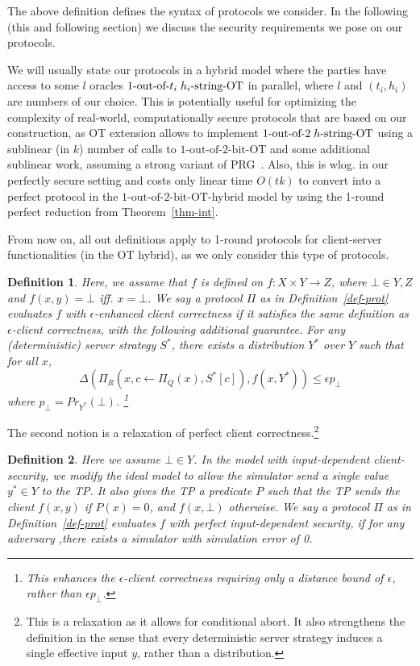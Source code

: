 \documentclass[a4paper]{article}
\newtheorem{definition}{Definition}[section]
\newcommand{\OT}[2]{#1\text{-out-of-}#2\text{-bit-OT}}
\newcommand{\sOT}[3]{#1\text{-out-of-}#2\text{\;$#3$-string-OT}}
\begin{document}
The above definition defines the syntax of protocols we consider. In the following (this and following section) we discuss the security requirements we pose on our protocols.

We will usually state our protocols in a hybrid model where the parties have access to some $l$ oracles $\sOT{1}{t_i}{h_i}$ in parallel, where $l$ and $(t_i,h_i)$ are numbers of our choice. 
This is potentially useful for optimizing the complexity of real-world, computationally secure protocols that are based on our construction, as OT extension allows to implement $\sOT{1}{2}{h}$ using a sublinear (in $k$) number of calls to $\OT{1}{2}$ and some additional sublinear work, assuming a strong variant of PRG~\cite{IKOS08}. 
Also, this is wlog. in our perfectly secure setting and costs only linear time $O(tk)$ to convert into a perfect protocol in the $\OT{1}{2}$-hybrid model by using the 1-round perfect reduction from Theorem~\ref{thm-int}.

From now on, all out definitions apply to 1-round protocols for client-server functionalities (in the OT hybrid), as we only consider this type of protocols. 

\begin{definition}\label{def-enh-cl}
Here, we assume that $f$ is defined on $f:X\times Y \rightarrow Z$,  where $\bot\in Y,Z$ and $f(x,y)=\bot$ iff. $x=\bot$.	
We say a protocol $\Pi$ as in Definition~\ref{def-prot} evaluates $f$ with  $\epsilon$-enhanced client correctness if it satisfies the same definition as $\epsilon$-client correctness, with the following additional guarantee.
For any (deterministic) server strategy $S^*$, there exists a distribution $Y^*$ over $Y$ such that for all $x$,
\[\Delta(\Pi_R(x,c\leftarrow \Pi_Q(x),S^*[c]), f(x,Y^*))\leq \epsilon p_{\bot}\] where $p_\bot=Pr_{Y^*}(\bot)$. \footnote{This enhances the $\epsilon$-client correctness requiring only a distance bound 
of $\epsilon$, rather than $\epsilon p_\bot$.} 
\end{definition}

The second notion is a relaxation of perfect client correctness.\footnote{This is a relaxation as it allows for conditional abort. It also strengthens the definition in the sense that every deterministic server strategy induces a single effective input $y$, rather than a distribution.}

\begin{definition}
Here we assume $\bot\in Y$.	
In the model with input-dependent client-security, we modify the ideal model to allow the simulator send a single value $y^*\in Y$ to the TP.	
It also gives the TP a predicate $P$ such that the TP sends the client $f(x,y)$ if $P(x)=0$, and $f(x,\bot)$ otherwise.	
We say a protocol $\Pi$ as in Definition~\ref{def-prot} evaluates $f$
with perfect input-dependent security, if for any adversary ,there exists a simulator with simulation error of 0.
\end{definition}
\end{document}
